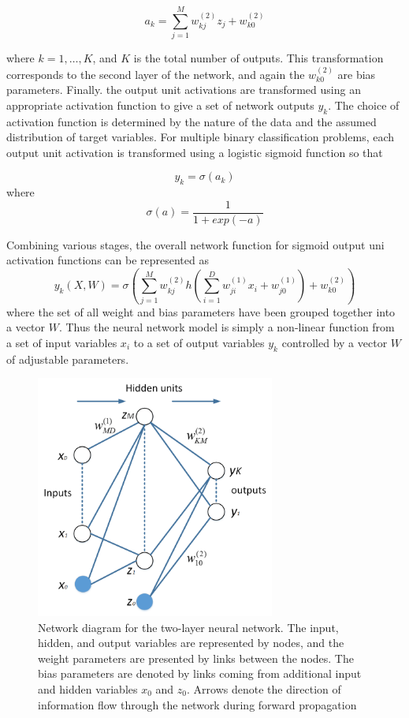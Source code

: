 \begin{equation}
a_{k}=\sum_{j=1}^{M}w_{kj}^{(2)}z_{j}+w_{k0}^{(2)}
\end{equation}


where $k = 1,\ldots ,K$, and $K$ is the total number of outputs. This transformation corresponds to the second layer of the network, and again the $w_{k0}^{(2)}$ are bias parameters. Finally. the output unit activations are transformed using an appropriate activation function to give a set of network outputs $y_{k}$. The choice of activation function is determined by the nature of the data and the assumed distribution of target variables. For multiple binary classification problems, each output unit activation is transformed using a logistic sigmoid function so that

\begin{equation}
y_{k}= \sigma(a_{k})
\end{equation}
where
\begin{equation}
\sigma(a)=\frac{1}{1+exp(-a)}
\end{equation}

Combining various stages, the overall network function for sigmoid output uni activation functions can be represented as
\begin{equation}
y_{k}(X,W)=\sigma(\sum_{j=1}^{M}w_{kj}^{(2)}h(\sum_{i=1}^{D}w_{ji}^{(1)}x_{i}+w_{j0}^{(1)})+w_{k0}^{(2)})
\end{equation}
where the set of all weight and bias parameters have been grouped together into a vector $W$. Thus the neural network model is simply a non-linear function from a set of input variables ${x_{i}}$ to a set of output variables $y_{k}$ controlled by a vector $W$ of adjustable parameters.


\begin{figure}[htb!]
\centering
\includegraphics[width=0.7\textwidth]{image/Method/ANN.png}
\caption[An ANN classifier]{Network diagram for the two-layer neural network. The input, hidden, and output variables are represented by nodes, and the weight parameters are presented by links between the nodes. The bias parameters are denoted by links coming from additional input and hidden variables $x_{0}$ and $z_{0}$. Arrows denote the direction of information flow through the network during forward propagation}
\label{fig:ANN}
\end{figure}

